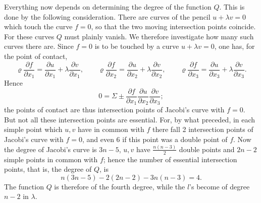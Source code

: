 \documentclass[10pt]{article}
\begin{document}
Everything now depends on determining the degree of the function \(Q\). This is done by the following consideration. There are curves of the pencil \(u+\lambda v=0\) which touch the curve \(f=0\), so that the two moving intersection points coincide. For these curves \(Q\) must plainly vanish. We therefore investigate how many such curves there are. Since \(f=0\) is to be touched by a curve \(u+\lambda v=0\), one has, for the point of contact,
\[
\varrho\frac{\partial f}{\partial x_1}=\frac{\partial u}{\partial x_1}+\lambda\frac{\partial v}{\partial x_1},\qquad
\varrho\frac{\partial f}{\partial x_2}=\frac{\partial u}{\partial x_2}+\lambda\frac{\partial v}{\partial x_2},\qquad
\varrho\frac{\partial f}{\partial x_3}=\frac{\partial u}{\partial x_3}+\lambda\frac{\partial v}{\partial x_3}.
\]
Hence
\[
0=\Sigma\pm \frac{\partial f}{\partial x_1}\frac{\partial u}{\partial x_2}\frac{\partial v}{\partial x_3};
\]
the points of contact are thus intersection points of Jacobi's curve with \(f=0\). But not all these intersection points are essential. For, by what preceded, in each simple point which \(u,v\) have in common with \(f\) there fall 2 intersection points of Jacobi's curve with \(f=0\), and even 6 if this point was a double point of \(f\). Now the degree of Jacobi's curve is \(3n-5\), \(u,v\) have \(\frac{n(n-3)}{2}\) double points and \(2n-2\) simple points in common with \(f\); hence the number of essential intersection points, that is, the degree of \(Q\), is
\[
n(3n-5)-2(2n-2)-3n(n-3)=4.
\]
The function \(Q\) is therefore of the fourth degree, while the \(l\)'s become of degree \(n-2\) in \(\lambda\).
\end{document}
